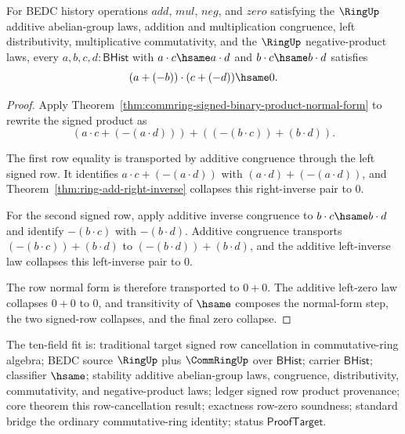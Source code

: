 \begin{theorem}
\label{thm:commring-signed-row-cancellations-zero}
For BEDC history operations $add$, $mul$, $neg$, and $zero$ satisfying the
$\RingUp$ additive abelian-group laws, addition and multiplication
congruence, left distributivity, multiplicative commutativity, and the
$\RingUp$ negative-product laws, every $a,b,c,d : \mathsf{BHist}$ with
$a\cdot c\hsame a\cdot d$ and $b\cdot c\hsame b\cdot d$ satisfies
$$
(a+(-b))\cdot(c+(-d))\hsame0.
$$
\end{theorem}
\begin{proof}
Apply Theorem~\ref{thm:commring-signed-binary-product-normal-form} to rewrite
the signed product as
$$
(a\cdot c+(-(a\cdot d)))+((-(b\cdot c))+(b\cdot d)).
$$

The first row equality is transported by additive congruence through the left
signed row. It identifies $a\cdot c+(-(a\cdot d))$ with
$(a\cdot d)+(-(a\cdot d))$, and Theorem~\ref{thm:ring-add-right-inverse}
collapses this right-inverse pair to $0$.

For the second signed row, apply additive inverse congruence to
$b\cdot c\hsame b\cdot d$ and identify $-(b\cdot c)$ with $-(b\cdot d)$.
Additive congruence transports $(-(b\cdot c))+(b\cdot d)$ to
$(-(b\cdot d))+(b\cdot d)$, and the additive left-inverse law collapses this
left-inverse pair to $0$.

The row normal form is therefore transported to $0+0$. The additive left-zero
law collapses $0+0$ to $0$, and transitivity of $\hsame$ composes the
normal-form step, the two signed-row collapses, and the final zero collapse.
\end{proof}

The ten-field fit is: traditional target signed row cancellation in
commutative-ring algebra; BEDC source $\RingUp$ plus $\CommRingUp$ over
$\mathsf{BHist}$; carrier $\mathsf{BHist}$; classifier $\hsame$; stability
additive abelian-group laws, congruence, distributivity, commutativity, and
negative-product laws; ledger signed row product provenance; core theorem
this row-cancellation result; exactness row-zero soundness; standard bridge
the ordinary commutative-ring identity; status $\mathsf{ProofTarget}$.


